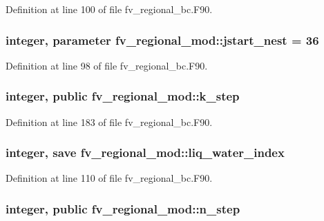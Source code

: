 Definition at line 100 of file fv\-\_\-regional\-\_\-bc.\-F90.

\subsubsection[{jstart\-\_\-nest}]{\setlength{\rightskip}{0pt plus 5cm}integer, parameter fv\-\_\-regional\-\_\-mod\-::jstart\-\_\-nest = 36\hspace{0.3cm}{\ttfamily [private]}}\label{classfv__regional__mod_a675de8ff14de24134c9d15abc2e2de40}


Definition at line 98 of file fv\-\_\-regional\-\_\-bc.\-F90.

\subsubsection[{k\-\_\-step}]{\setlength{\rightskip}{0pt plus 5cm}integer, public fv\-\_\-regional\-\_\-mod\-::k\-\_\-step}\label{classfv__regional__mod_a4526a6a4dc765d8f17c9b291687bd316}


Definition at line 183 of file fv\-\_\-regional\-\_\-bc.\-F90.

\subsubsection[{liq\-\_\-water\-\_\-index}]{\setlength{\rightskip}{0pt plus 5cm}integer, save fv\-\_\-regional\-\_\-mod\-::liq\-\_\-water\-\_\-index\hspace{0.3cm}{\ttfamily [private]}}\label{classfv__regional__mod_a4d329cbebba02218379970b776449bbf}


Definition at line 110 of file fv\-\_\-regional\-\_\-bc.\-F90.

\subsubsection[{n\-\_\-step}]{\setlength{\rightskip}{0pt plus 5cm}integer, public fv\-\_\-regional\-\_\-mod\-::n\-\_\-step}\label{classfv__regional__mod_afe2252139409c2841f1f01af51dd8fc3}


